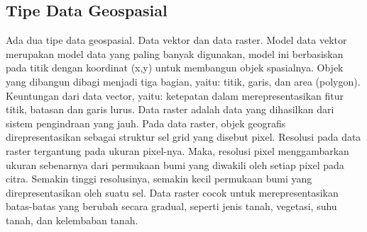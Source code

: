 \subsection{Tipe Data Geospasial}
Ada dua tipe data geospasial. Data vektor dan data raster. Model data vektor merupakan model data yang paling banyak digunakan, model ini berbasiskan pada titik dengan koordinat (x,y) untuk membangun objek spasialnya. Objek yang dibangun
dibagi menjadi tiga bagian, yaitu: titik, garis, dan area (polygon).
Keuntungan dari data vector, yaitu: ketepatan dalam merepresentasikan fitur titik, batasan dan
garis lurus. Data raster adalah data yang dihasilkan dari sistem pengindraan yang jauh. Pada data raster,
objek geografis direpresentasikan sebagai struktur sel grid yang disebut pixel. Resolusi pada data
raster tergantung pada ukuran pixel-nya.
Maka, resolusi pixel menggambarkan ukuran sebenarnya dari permukaan bumi yang diwakili
oleh setiap pixel pada citra. Semakin tinggi resolusinya, semakin kecil permukaan bumi yang
direpresentasikan oleh suatu sel. Data raster cocok untuk merepresentasikan batas-batas yang
berubah secara gradual, seperti jenis tanah, vegetasi, suhu tanah, dan kelembaban tanah.


